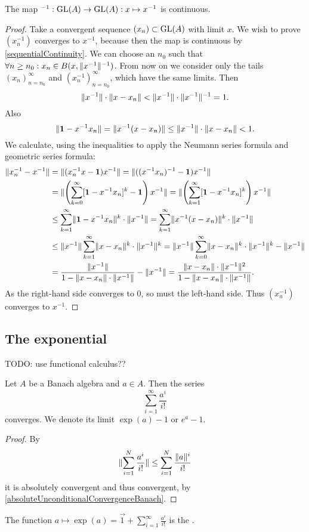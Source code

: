 \begin{proposition} \label{inverseMapContinuous}
The map $^{-1}: \operatorname{GL}(A)\to\operatorname{GL}(A): x\mapsto x^{-1}$ is continuous.
\end{proposition}
\begin{proof}
Take a convergent sequence $(x_n)\subset\operatorname{GL}(A)$ with limit $x$. We wish to prove $(x_n^{-1})$ converges to $x^{-1}$, because then the map is continuous by \ref{sequentialContinuity}. We can choose an $n_0$ such that $\forall n\geq n_0: x_n \in B(x,\lVert x^{-1}\rVert^{-1})$. From now on we consider only the tails $(x_n)_{n=n_0}^\infty$ and $(x_n^{-1})_{n=n_0}^\infty$, which have the same limits. Then
\[ \lVert x^{-1}\rVert\cdot\lVert x-x_n\rVert < \lVert x^{-1}\rVert\cdot\lVert x^{-1}\rVert^{-1} = 1. \]
Also
\[ \lVert\boldsymbol{\mathrm{1}} - x^{-1}x_n\rVert = \lVert x^{-1}(x-x_n)\rVert \leq \lVert x^{-1}\rVert\cdot\lVert x-x_n\rVert < 1. \]
We calculate, using the inequalities to apply the Neumann series formula and geometric series formula:
\begin{align*}
\lVert x_n^{-1} - x^{-1}\rVert &= \lVert(x_n^{-1}x - \boldsymbol{\mathrm{1}})x^{-1}\rVert = \lVert((x^{-1}x_n)^{-1} - \boldsymbol{\mathrm{1}})x^{-1}\rVert \\
&= \lVert\left(\sum_{k=0}^\infty[\boldsymbol{\mathrm{1}} - x^{-1}x_n]^k - \boldsymbol{\mathrm{1}}\right)x^{-1}\rVert = \lVert\left(\sum_{k=1}^\infty[\boldsymbol{\mathrm{1}} - x^{-1}x_n]^k\right)x^{-1}\rVert \\
&\leq \sum_{k=1}^\infty\lVert\boldsymbol{\mathrm{1}} - x^{-1}x_n\rVert^k\cdot\lVert x^{-1}\rVert = \sum_{k=1}^\infty\lVert x^{-1}(x - x_n)\rVert^k\cdot\lVert x^{-1}\rVert \\
&\leq \lVert x^{-1}\rVert\sum_{k=1}^\infty\lVert x - x_n\rVert^k\cdot\lVert x^{-1}\rVert^{k} = \lVert x^{-1}\rVert\sum_{k=0}^\infty\lVert x - x_n\rVert^k\cdot\lVert x^{-1}\rVert^{k} - \lVert x^{-1}\rVert \\
&= \frac{\lVert x^{-1}\rVert}{1-\lVert x - x_n\rVert\cdot\lVert x^{-1}\rVert}-\lVert x^{-1}\rVert = \frac{\lVert x - x_n\rVert\cdot\lVert x^{-1}\rVert^2}{1-\lVert x - x_n\rVert\cdot\lVert x^{-1}\rVert}.
\end{align*}
As the right-hand side converges to $0$, so must the left-hand side. Thus $(x_n^{-1})$ converges to $x^{-1}$.
\end{proof}


\subsection{The exponential}
TODO: use functional calculus??

\begin{proposition}
Let $A$ be a Banach algebra and $a\in A$. Then the series
\[ \sum_{i=1}^\infty \frac{a^i}{i!} \]
converges. We denote its limit $\exp(a)-1$ or $e^a-1$.
\end{proposition}
\begin{proof}
By
\[ \lVert\sum_{i=1}^N \frac{a^i}{i!}\rVert \leq \sum_{i=1}^N \frac{\lVert a\rVert^i}{i!} \]
it is absolutely convergent and thus convergent, by \ref{absoluteUnconditionalConvergenceBanach}.
\end{proof}
The function $a\mapsto \exp(a) = \vec{1} + \sum_{i=1}^\infty \frac{a^i}{i!}$ is the .

